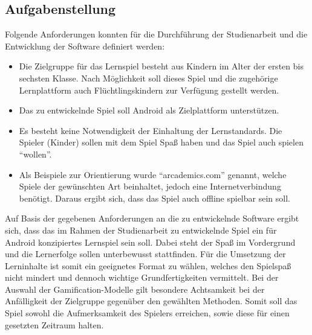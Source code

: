\subsection{Aufgabenstellung}
	Folgende Anforderungen konnten für die Durchführung der Studienarbeit und die Entwicklung der Software definiert werden:
	\begin{itemize}
		\item{ Die Zielgruppe für das Lernspiel besteht aus Kindern im Alter der ersten bis sechsten Klasse. Nach Möglichkeit soll dieses Spiel und die zugehörige Lernplattform auch Flüchtlingskindern zur Verfügung gestellt werden. }
		\item{ Das zu entwickelnde Spiel soll Android als Zielplattform unterstützen. }
		\item{ Es besteht keine Notwendigkeit der Einhaltung der Lernstandards. Die Spieler (Kinder) sollen mit dem Spiel Spaß haben und das Spiel auch spielen \enquote{wollen}. }
		\item{ Als Beispiele zur Orientierung wurde \enquote{arcademics.com} genannt, welche Spiele der gewünschten Art beinhaltet, jedoch eine Internetverbindung benötigt. Daraus ergibt sich, dass das Spiel auch offline spielbar sein soll. }
	\end{itemize}
	Auf Basis der gegebenen Anforderungen an die zu entwickelnde Software ergibt sich, dass das im Rahmen der Studienarbeit zu entwickelnde Spiel ein für Android konzipiertes Lernspiel sein soll. Dabei steht der Spaß im Vordergrund und die Lernerfolge sollen unterbewusst stattfinden. Für die Umsetzung der Lerninhalte ist somit ein geeignetes Format zu wählen, welches den Spielspaß nicht mindert und dennoch wichtige Grundfertigkeiten vermittelt.
	Bei der Auswahl der Gamification-Modelle gilt besondere Achtsamkeit bei der Anfälligkeit der Zielgruppe gegenüber den gewählten Methoden. Somit soll das Spiel sowohl die Aufmerksamkeit des Spielers erreichen, sowie diese für einen gesetzten Zeitraum halten.

